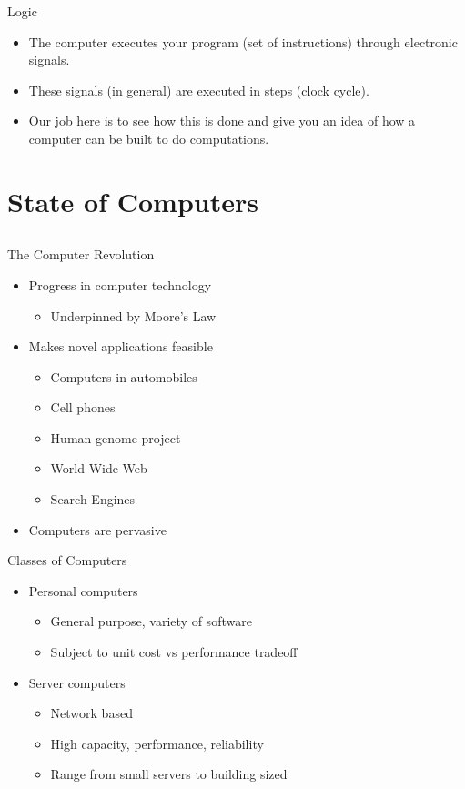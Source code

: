 \documentclass{beamer}
\begin{document}
\begin{frame}{Logic}
\begin{itemize}
\item The computer executes your program (set of instructions) through electronic signals.
\item These signals (in general) are executed in steps (clock cycle).
\item Our job here is to see how this is done and give you an idea of how a computer can be built to do computations.
\end{itemize}
\end{frame}

\section{State of Computers}
\subsection{}
\begin{frame}{The Computer Revolution}
\begin{itemize}
\item Progress in computer technology
\begin{itemize}
\item Underpinned by Moore's Law 
\end{itemize}
\item Makes novel applications feasible
\begin{itemize}
\item Computers in automobiles
\item Cell phones
\item Human genome project
\item World Wide Web
\item Search Engines
\end{itemize}
\item Computers are pervasive
\end{itemize}
\end{frame}

\begin{frame}{Classes of Computers}
\begin{itemize}
\item Personal computers
\begin{itemize}
\item General purpose, variety of software
\item Subject to unit cost vs performance tradeoff
\end{itemize}
\item Server computers
\begin{itemize}
\item Network based
\item High capacity, performance, reliability
\item Range from small servers to building sized
\end{itemize}
\end{itemize}
\end{frame}
\end{document}
